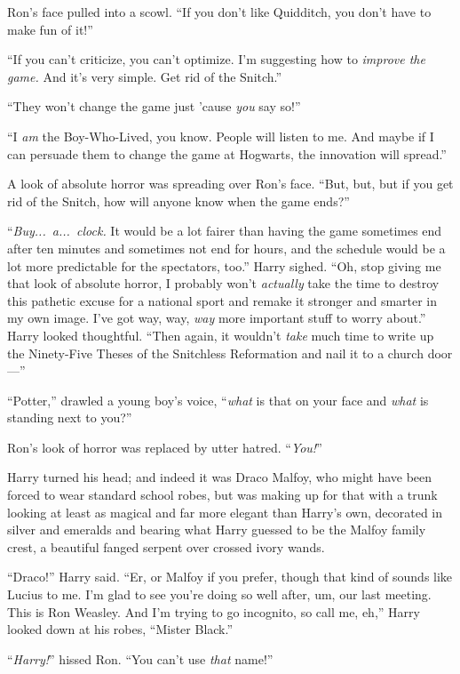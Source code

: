 Ron’s face pulled into a scowl. “If you don’t like Quidditch, you don’t have to make fun of it!”

“If you can’t criticize, you can’t optimize. I’m suggesting how to \emph{improve the game.} And it’s very simple. Get rid of the Snitch.”

“They won’t change the game just ’cause \emph{you} say so!”

“I \emph{am} the Boy-Who-Lived, you know. People will listen to me. And maybe if I can persuade them to change the game at Hogwarts, the innovation will spread.”

A look of absolute horror was spreading over Ron’s face. “But, but, but if you get rid of the Snitch, how will anyone know when the game ends?”

“\emph{Buy...\ a...\ clock.} It would be a lot fairer than having the game sometimes end after ten minutes and sometimes not end for hours, and the schedule would be a lot more predictable for the spectators, too.” Harry sighed. “Oh, stop giving me that look of absolute horror, I probably won’t \emph{actually} take the time to destroy this pathetic excuse for a national sport and remake it stronger and smarter in my own image. I’ve got way, way, \emph{way} more important stuff to worry about.” Harry looked thoughtful. “Then again, it wouldn’t \emph{take} much time to write up the Ninety-Five Theses of the Snitchless Reformation and nail it to a church door—”

“Potter,” drawled a young boy’s voice, “\emph{what} is that on your face and \emph{what} is standing next to you?”

Ron’s look of horror was replaced by utter hatred. “\emph{You!}”

Harry turned his head; and indeed it was Draco Malfoy, who might have been forced to wear standard school robes, but was making up for that with a trunk looking at least as magical and far more elegant than Harry’s own, decorated in silver and emeralds and bearing what Harry guessed to be the Malfoy family crest, a beautiful fanged serpent over crossed ivory wands.

“Draco!” Harry said. “Er, or Malfoy if you prefer, though that kind of sounds like Lucius to me. I’m glad to see you’re doing so well after, um, our last meeting. This is Ron Weasley. And I’m trying to go incognito, so call me, eh,” Harry looked down at his robes, “Mister Black.”

“\emph{Harry!}” hissed Ron. “You can’t use \emph{that} name!”

